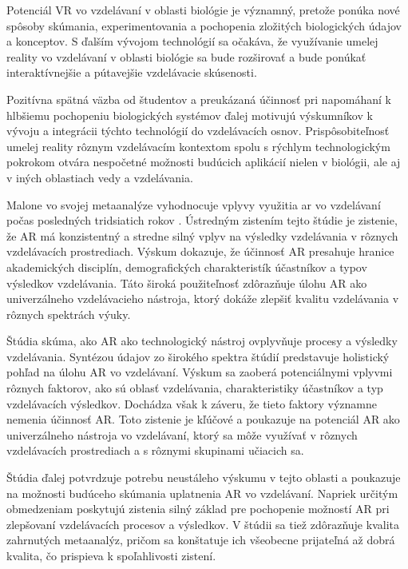 Potenciál VR vo vzdelávaní v oblasti biológie je významný, pretože ponúka nové spôsoby skúmania, experimentovania a pochopenia zložitých biologických údajov a konceptov. S ďalším 
vývojom technológií sa očakáva, že využívanie umelej reality vo vzdelávaní v oblasti biológie sa bude rozširovať a bude ponúkať interaktívnejšie a pútavejšie vzdelávacie skúsenosti.

Pozitívna spätná väzba od študentov a preukázaná účinnosť pri napomáhaní k hlbšiemu pochopeniu biologických systémov ďalej motivujú výskumníkov k vývoju a integrácii týchto technológií 
do vzdelávacích osnov. Prispôsobiteľnosť umelej reality rôznym vzdelávacím kontextom spolu s rýchlym technologickým pokrokom otvára nespočetné možnosti budúcich aplikácií nielen v biológii, 
ale aj v iných oblastiach vedy a vzdelávania.

Malone vo svojej metaanalýze vyhodnocuje vplyvy využitia \acrshort{ar} vo vzdelávaní počas posledných tridsiatich rokov \cite{maloneThreeDecadesAugmented2023}. 
Ústredným zistením tejto štúdie je zistenie, že AR má konzistentný a stredne silný vplyv na výsledky vzdelávania v rôznych vzdelávacích prostrediach. Výskum dokazuje, že účinnosť 
AR presahuje hranice akademických disciplín, demografických charakteristík účastníkov a typov výsledkov vzdelávania. Táto široká použiteľnosť zdôrazňuje úlohu AR ako univerzálneho 
vzdelávacieho nástroja, ktorý dokáže zlepšiť kvalitu vzdelávania v rôznych spektrách výuky.

Štúdia skúma, ako AR ako technologický nástroj ovplyvňuje procesy a výsledky vzdelávania. Syntézou údajov zo širokého spektra štúdií predstavuje holistický pohľad na úlohu AR vo vzdelávaní. 
Výskum sa zaoberá potenciálnymi vplyvmi rôznych faktorov, ako sú oblasť vzdelávania, charakteristiky účastníkov a typ vzdelávacích výsledkov. Dochádza však k záveru, že tieto faktory významne nemenia 
účinnosť AR. Toto zistenie je kľúčové a poukazuje na potenciál AR ako univerzálneho nástroja vo vzdelávaní, ktorý sa môže využívať v rôznych vzdelávacích prostrediach a s rôznymi skupinami učiacich sa.

Štúdia ďalej potvrdzuje potrebu neustáleho výskumu v tejto oblasti a poukazuje na možnosti budúceho skúmania uplatnenia AR vo vzdelávaní. Napriek určitým obmedzeniam poskytujú zistenia silný základ 
pre pochopenie možností AR pri zlepšovaní vzdelávacích procesov a výsledkov. V štúdii sa tiež zdôrazňuje kvalita zahrnutých metaanalýz, pričom sa konštatuje ich všeobecne prijateľná až dobrá kvalita, 
čo prispieva k spoľahlivosti zistení.

